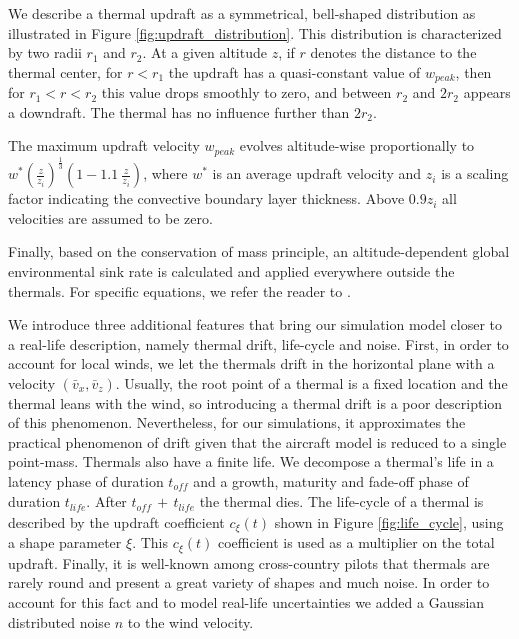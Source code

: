 \documentclass{jfpda}
\begin{document}

We describe a thermal updraft as a symmetrical, bell-shaped distribution as illustrated in Figure \ref{fig:updraft_distribution}. This distribution is characterized by two radii $r_1$ and $r_2$. At a given altitude $z$, if $r$ denotes the distance to the thermal center, for $r<r_1$ the updraft has a quasi-constant value of $w_{peak}$, then for $r_1<r<r_2$ this value drops smoothly to zero, and between $r_2$ and $2r_2$ appears a downdraft. The thermal has no influence further than $2r_2$.

The maximum updraft velocity $w_{peak}$ evolves altitude-wise proportionally to $w^* \left( \frac{z}{z_i} \right)^{\frac{1}{3}} \left(1 - 1.1 \ \frac{z}{z_i}\right)$, where $w^*$ is an average updraft velocity and $z_i$ is a scaling factor indicating the convective boundary layer thickness.
Above $0.9z_i$ all velocities are assumed to be zero.

Finally, based on the conservation of mass principle, an altitude-dependent global environmental sink rate is calculated and applied everywhere outside the thermals. For specific equations, we refer the reader to \cite{allen_thermal}.

We introduce three additional features that bring our simulation model closer to a real-life description, namely thermal drift, life-cycle and noise.
First, in order to account for local winds, we let the thermals drift in the horizontal plane with a velocity $(\bar{v}_x, \bar{v}_z)$. Usually, the root point of a thermal is a fixed location and the thermal leans with the wind, so introducing a thermal drift is a poor description of this phenomenon. Nevertheless, for our simulations, it approximates the practical phenomenon of drift given that the aircraft model is reduced to a single point-mass.
Thermals also have a finite life. We decompose a thermal's life in a latency phase of duration $t_{\textit{off}}$ and a growth, maturity and fade-off phase of duration $t_{\textit{life}}$. After $t_{\textit{off}} \, + \, t_{\textit{life}}$ the thermal dies. The life-cycle of a thermal is described by the updraft coefficient $c_\xi(t)$ shown in Figure \ref{fig:life_cycle}, using a shape parameter $\xi$. This $c_\xi(t)$ coefficient is used as a multiplier on the total updraft.
Finally, it is well-known among cross-country pilots that thermals are rarely round and present a great variety of shapes and much noise. In order to account for this fact and to model real-life uncertainties we added a Gaussian distributed noise $n$ to the wind velocity.
\end{document}
